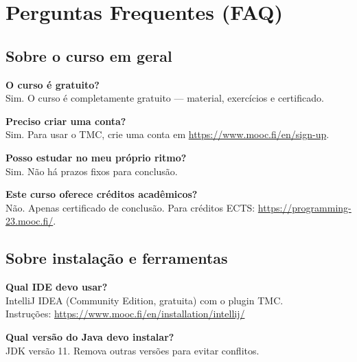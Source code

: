 \documentclass[11pt,a4paper]{article}
\begin{document}
\section{Perguntas Frequentes (FAQ)}

\subsection{Sobre o curso em geral}

\begin{faqbox}
\textbf{O curso é gratuito?}\\
Sim. O curso é completamente gratuito — material, exercícios e certificado.
\end{faqbox}

\vspace{0.5em}
\begin{faqbox}
\textbf{Preciso criar uma conta?}\\
Sim. Para usar o TMC, crie uma conta em \url{https://www.mooc.fi/en/sign-up}.
\end{faqbox}

\vspace{0.5em}
\begin{faqbox}
\textbf{Posso estudar no meu próprio ritmo?}\\
Sim. Não há prazos fixos para conclusão.
\end{faqbox}

\vspace{0.5em}
\begin{faqbox}
\textbf{Este curso oferece créditos acadêmicos?}\\
Não. Apenas certificado de conclusão. Para créditos ECTS: \url{https://programming-23.mooc.fi/}.
\end{faqbox}

\subsection{Sobre instalação e ferramentas}

\begin{faqbox}
\textbf{Qual IDE devo usar?}\\
IntelliJ IDEA (Community Edition, gratuita) com o plugin TMC.\\
Instruções: \url{https://www.mooc.fi/en/installation/intellij/}
\end{faqbox}

\vspace{0.5em}
\begin{faqbox}
\textbf{Qual versão do Java devo instalar?}\\
JDK versão 11. Remova outras versões para evitar conflitos.
\end{faqbox}
\end{document}
